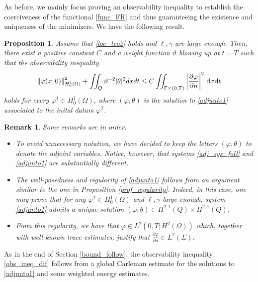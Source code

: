\documentclass[preprint,10pt]{article}
\newtheorem{proposition}[theorem]{Proposition}
\newtheorem{remark}[theorem]{Remark}
\numberwithin{equation}{section}
\numberwithin{theorem}{section}
\def\dt{\textnormal{d}t}
\def\d{\,\textnormal{d}}
\def\cbd{\Gamma}
\def\dt{\textnormal{d}t}
\def\d{\,\textnormal{d}}
\begin{document}
{As before, we mainly focus proving an observability inequality to establish the coerciveness of the functional \eqref{func_FR} and thus guaranteeing the existence and uniqueness of the minimizers. We have the following result.
%
\begin{proposition}\label{prop_obs_ineq_dif}
Assume that \eqref{loc_teo2} holds and $\ell,\gamma$ are large enough.  Then, there exist a positive constant $C$ and a weight function $\vartheta$ blowing up at $t=T$ such that the observability inequality
%
\begin{equation}\label{obs_ineq_dif}
\left\|\varphi(x,0)\right\|^2_{H_0^1(\Omega)}+\iint_{Q}{\vartheta}^{-2}|\theta|^2dxdt\leq C\iint_{\cbd \times(0,T)}\left|\frac{\partial \varphi}{\partial n} \right|^2\d\sigma\dt
\end{equation}
%
holds for every $\varphi^T\in H_0^{1}(\Omega)$, where $(\varphi,\theta)$ is the solution to \eqref{adjunto1} associated to the inital datum $\varphi^T$. 
\end{proposition}
%

\begin{remark}
Some remarks are in order.
%
\begin{itemize}
\item To avoid unnecessary notation, we have decided to keep the letters $(\varphi,\theta)$ to denote the adjoint variables. Notice, however, that  systems \eqref{adj_sys_foll} and \eqref{adjunto1} are substantially different. 
\item The well-posedness and regularity of \eqref{adjunto1} follows from an argument similar to the one in Proposition \ref{prof_regularity}. Indeed, in this case, one may prove that for any $\varphi^T\in H_0^1(\Omega)$ and $\ell,\gamma$ large enough, system \eqref{adjunto1} admits a unique solution $(\varphi,\theta)\in H^{2,1}(Q)\times H^{2,1}(Q)$. 
\item From this regularity, we have that $\varphi\in L^2(0,T;H^2(\Omega))$ which, together with well-known trace estimates, justify that $\frac{\partial\varphi}{\partial n}\in L^2(\Sigma)$.
\end{itemize}
%
\end{remark}

As in the end of Section \ref{bound_follow}, the observability inequality \eqref{obs_ineq_dif} follows from a global Carleman estimate for the solutions to \eqref{adjunto1} and some weighted energy estimates. 

}
\end{document}
